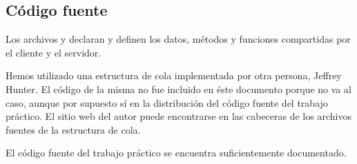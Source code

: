 \subsection{Código fuente}

Los archivos  y  declaran y definen los
datos, métodos y funciones compartidas por el cliente y el servidor.

Hemos utilizado una estructura de cola implementada por otra persona, Jeffrey
Hunter. El código de la misma no fue incluido en éste documento porque no va al
caso, aunque por supuesto sí en la distribución del código fuente del trabajo
práctico. El sitio web del autor puede encontrarse en las cabeceras de los
archivos fuentes de la estructura de cola.

El código fuente del trabajo práctico se encuentra suficientemente documentado.






